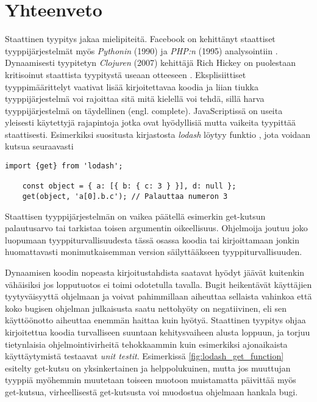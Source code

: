 \chapter{Yhteenveto}
Staattinen tyypitys jakaa mielipiteitä. Facebook on kehittänyt
staattiset tyyppijärjestelmät myös \textit{Pythonin} (1990) ja \textit{PHP:n} (1995)
analysointiin \cite{PyreCheck, HackLang}.
Dynaamisesti tyypitetyn \textit{Clojuren} (2007) kehittäjä
Rich Hickey on puolestaan kritisoinut staattista
tyypitystä useaan otteeseen \cite{10YearsOfClojure}. Eksplisiittiset
tyyppimäärittelyt vaativat lisää kirjoitettavaa koodia ja liian tiukka
tyyppijärjestelmä voi rajoittaa sitä mitä kielellä voi tehdä, sillä harva
tyyppijärjestelmä on täydellinen (engl. complete). JavaScriptissä on useita
yleisesti käytettyjä rajapintoja jotka ovat hyödyllisiä mutta vaikeita
tyypittää staattisesti. Esimerkiksi suositusta kirjastosta \textit{lodash}
löytyy funktio  \cite{LodashGet}, jota voidaan kutsua
seuraavasti

\begin{lstlisting}[caption={
	get-funktiolla voidaan palauttaa arvo syvältä
	objektin sisältä välittämättä mahdollisesti puuttuvista arvoista.},
  label={fig:lodash_get_function},
  aboveskip={20pt}
]
	import {get} from 'lodash';

	const object = { a: [{ b: { c: 3 } }], d: null };
	get(object, 'a[0].b.c'); // Palauttaa numeron 3
\end{lstlisting}

Staattisen tyyppijärjestelmän on vaikea päätellä esimerkin get-kutsun
palautusarvo tai tarkistaa toisen argumentin oikeellisuus. Ohjelmoija joutuu
joko luopumaan tyyppiturvallisuudesta tässä
osassa koodia tai kirjoittamaan jonkin
huomattavasti monimutkaisemman version säilyttääkseen tyyppiturvallisuuden.

Dynaamisen koodin nopeasta kirjoitustahdista saatavat hyödyt jäävät kuitenkin
vähäisiksi jos lopputuotos ei toimi odotetulla tavalla. Bugit heikentävät
käyttäjien tyytyväisyyttä ohjelmaan ja voivat pahimmillaan aiheuttaa sellaista
vahinkoa että koko bugisen ohjelman julkaisusta saatu nettohyöty on negatiivinen,
eli sen käyttöönotto aiheuttaa enemmän haittaa kuin hyötyä. Staattinen tyypitys
ohjaa kirjoitettua koodia turvalliseen suuntaan kehitysvaiheen alusta
loppuun, ja torjuu tietynlaisia ohjelmointivirheitä tehokkaammin kuin
esimerkiksi ajonaikaista käyttäytymistä testaavat \textit{unit testit}.
Esimerkissä \ref{fig:lodash_get_function} esitelty get-kutsu on yksinkertainen
ja helppolukuinen, mutta jos muuttujan  tyyppiä myöhemmin
muutetaan toiseen muotoon muistamatta päivittää myös get-kutsua, virheellisestä
get-kutsusta voi muodostua ohjelmaan hankala bugi.

